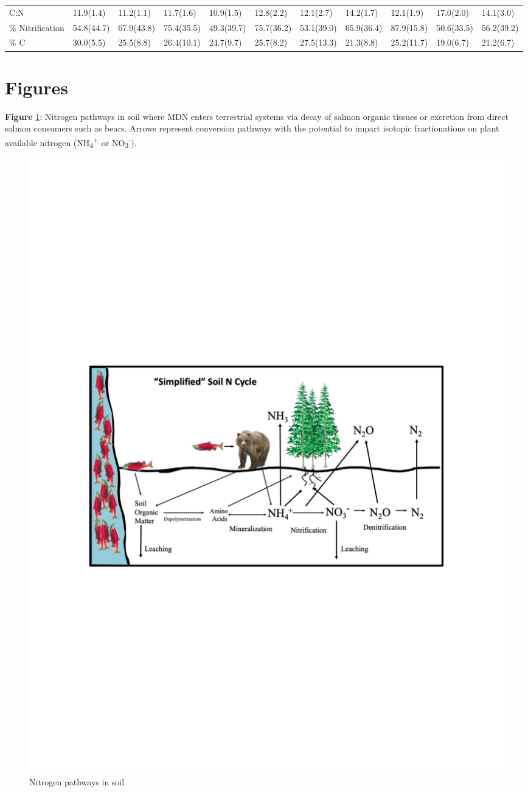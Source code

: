 \documentclass [11pt, proquest] {uwthesis}[2015/03/03]
\begin{document}
\begin{landscape}
\begin{longtable}[t]{lllllllllll}
\addlinespace
C:N & 11.9(1.4) & 11.2(1.1) & 11.7(1.6) & 10.9(1.5) & 12.8(2.2) & 12.1(2.7) & 14.2(1.7) & 12.1(1.9) & 17.0(2.0) & 14.1(3.0)\\
\% Nitrification & 54.8(44.7) & 67.9(43.8) & 75.4(35.5) & 49.3(39.7) & 75.7(36.2) & 53.1(39.0) & 65.9(36.4) & 87.9(15.8) & 50.6(33.5) & 56.2(39.2)\\
\% C & 30.0(5.5) & 25.5(8.8) & 26.4(10.1) & 24.7(9.7) & 25.7(8.2) & 27.5(13.3) & 21.3(8.8) & 25.2(11.7) & 19.0(6.7) & 21.2(6.7)\\
\bottomrule
\end{longtable}
\endgroup{}


\end{landscape}
\clearpage

\section{Figures}\label{figures}

\textbf{Figure} \ref{fig:npathways}: Nitrogen pathways in soil where MDN
enters terrestrial systems via decay of salmon organic tissues or
excretion from direct salmon consumers such as bears. Arrows represent
conversion pathways with the potential to impart isotopic fractionations
on plant available nitrogen (NH\textsubscript{4}\textsuperscript{+} or
NO\textsubscript{3}\textsuperscript{-}).\newline
\begin{figure}[h]
  \includegraphics{figure/Ch1/fig1.1.pdf}
  \caption{Nitrogen pathways in soil}
  \label{fig:npathways}
\end{figure}
\clearpage
\end{document}
